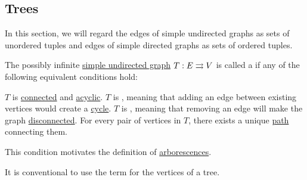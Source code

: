 \subsection{Trees}\label{subsec:trees}

In this section, we will regard the edges of simple undirected graphs as sets of unordered tuples and edges of simple directed graphs as sets of ordered tuples.

\begin{definition}\label{def:tree}
  The possibly infinite \hyperref[def:undirected_graph]{simple undirected graph} \( T: E \rightrightarrows V \) is called a  if any of the following equivalent conditions hold:
  \begin{thmenum}
     \( T \) is \hyperref[def:undirected_multigraph_connectedness]{connected} and \hyperref[def:undirected_multigraph_path/cycle]{acyclic}.
     \( T \) is , meaning that adding an edge between existing vertices would create a \hyperref[def:undirected_multigraph_path/cycle]{cycle}.
     \( T \) is , meaning that removing an edge will make the graph \hyperref[def:quiver_connectedness]{disconnected}.
     For every pair of vertices in \( T \), there exists a unique \hyperref[def:quiver_path]{path} connecting them.

    This condition motivates the definition of \hyperref[def:arborescence]{arborescences}.
  \end{thmenum}

  It is conventional to use the term  for the vertices of a tree.
\end{definition}
